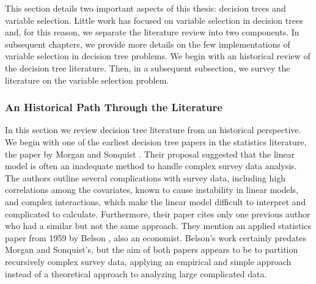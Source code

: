 


%

This section details two important aspects of this thesis: decision trees and variable selection. Little work has focused on variable selection in decision trees and, for this reason, we separate the literature review into two components. In subsequent chapters, we provide more details on the few implementations of variable selection in decision tree problems. We begin with an historical review of the decision tree literature. Then, in a subsequent subsection, we survey the literature on the variable selection problem. 

\subsubsection{An Historical Path Through the Literature}

In this section we review decision tree literature from an historical perspective. We begin with one of the earliest decision tree papers in the statistics literature, the paper by Morgan and Sonquist \cite{morgan1963problems}. Their proposal suggested that the linear model is often an inadequate method to handle complex survey data analysis. The authors outline several complications with survey data, including high correlations among the covariates, known to cause instability in linear models, and complex interactions, which make the linear model difficult to interpret and complicated to calculate. Furthermore, their paper cites only one previous author who had a similar but not the same approach. They mention an applied statistics paper from 1959 by Belson \cite{belson1959matching}, also an economist. Belson's work certainly predates Morgan and Sonquist's, but the aim of both papers appears to be to partition recursively complex survey data, applying an empirical and simple approach instead of a theoretical approach to analyzing large complicated data. 

